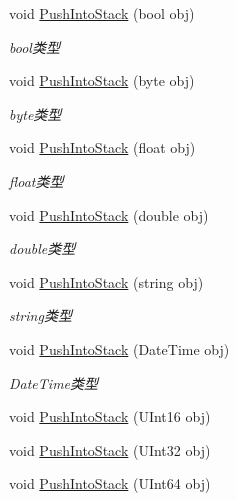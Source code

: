 \begin{DoxyCompactItemize}
void \mbox{\hyperlink{class_t_net_1_1_service_1_1_data_struct_a292026150b003ea0e7c27856b7ae4255}{Push\+Into\+Stack}} (bool obj)
\begin{DoxyCompactList}\small\item\em bool类型 \end{DoxyCompactList}\item 
void \mbox{\hyperlink{class_t_net_1_1_service_1_1_data_struct_afce779ace4798c77a3f5169aaad4ed2b}{Push\+Into\+Stack}} (byte obj)
\begin{DoxyCompactList}\small\item\em byte类型 \end{DoxyCompactList}\item 
void \mbox{\hyperlink{class_t_net_1_1_service_1_1_data_struct_a897181b710f4dab06394944795b83a14}{Push\+Into\+Stack}} (float obj)
\begin{DoxyCompactList}\small\item\em float类型 \end{DoxyCompactList}\item 
void \mbox{\hyperlink{class_t_net_1_1_service_1_1_data_struct_abc95a252acf3f71c089e2d80f1c5b83b}{Push\+Into\+Stack}} (double obj)
\begin{DoxyCompactList}\small\item\em double类型 \end{DoxyCompactList}\item 
void \mbox{\hyperlink{class_t_net_1_1_service_1_1_data_struct_a478dfc2b04efe0d29686565ddaebbe2c}{Push\+Into\+Stack}} (string obj)
\begin{DoxyCompactList}\small\item\em string类型 \end{DoxyCompactList}\item 
void \mbox{\hyperlink{class_t_net_1_1_service_1_1_data_struct_a75ba8dc27467544e042fb653d603bc48}{Push\+Into\+Stack}} (Date\+Time obj)
\begin{DoxyCompactList}\small\item\em Date\+Time类型 \end{DoxyCompactList}\item 
void \mbox{\hyperlink{class_t_net_1_1_service_1_1_data_struct_ab3becc62c808c0d9818ababfa44eccbb}{Push\+Into\+Stack}} (U\+Int16 obj)
\item 
void \mbox{\hyperlink{class_t_net_1_1_service_1_1_data_struct_a95fe0e67aea1efd2d2822fb3c3e7194a}{Push\+Into\+Stack}} (U\+Int32 obj)
\item 
void \mbox{\hyperlink{class_t_net_1_1_service_1_1_data_struct_acbb88e76a7b7e280c50f6d1fc001ea85}{Push\+Into\+Stack}} (U\+Int64 obj)

\end{DoxyCompactItemize}
